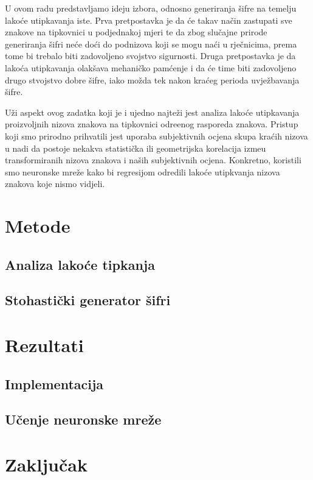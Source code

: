 \documentclass[a4paper,twocolumn,dvipdfm]{article}
\begin{document}
U ovom radu predstavljamo ideju izbora, odnosno generiranja \v{s}ifre na
temelju lako\'ce utipkavanja iste. Prva pretpostavka je da \'ce takav na\v{c}in
zastupati sve znakove na tipkovnici u podjednakoj mjeri te da zbog slu\v{c}ajne
prirode generiranja \v{s}ifri ne\'ce do\'ci do podnizova koji se mogu na\'ci u
rje\v{c}nicima, prema tome bi trebalo biti zadovoljeno svojstvo sigurnosti.
Druga pretpostavka je da lako\'ca utipkavanja olak\v{s}ava mehani\v{c}ko
pam\'cenje i da \'ce time biti zadovoljeno drugo stvojstvo dobre \v{s}ifre,
iako mo\v{z}da tek nakon kra\'ceg perioda uvje\v{z}bavanja \v{s}ifre.

U\v{z}i aspekt ovog zadatka koji je i ujedno najte\v{z}i jest analiza lako\'ce
utipkavanja proizvoljnih nizova znakova na tipkovnici odre\dj enog rasporeda
znakova. Pristup koji smo prirodno prihvatili jest uporaba subjektivnih ocjena
skupa kra\'cih nizova u nadi da postoje nekakva statisti\v{c}ka ili geometrijska
korelacija izme\dj u transformiranih nizova znakova i na\v{s}ih subjektivnih ocjena.
Konkretno, koristili smo neuronske mre\v{z}e kako bi regresijom odredili lako\'ce
utipkvanja nizova znakova koje nismo vidjeli.

\section{Metode}

\subsection{Analiza lako\'ce tipkanja}

\subsection{Stohasti\v{c}ki generator \v{s}ifri}

\section{Rezultati}

\subsection{Implementacija}

\subsection{U\v{c}enje neuronske mre\v{z}e}

\section{Zaklju\v{c}ak}
\end{document}
